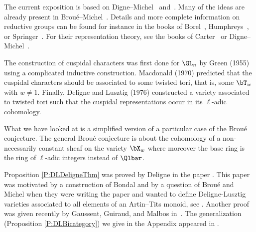 The current exposition is based on Digne--Michel~\cite{DiMBook} and~\cite{DiMDel}. Many of the ideas are already present in Brou\'e--Michel~\cite{BrMi}. Details and more complete information on reductive groups can be found for instance in the books of Borel~\cite{borel}, Humphreys~\cite{humphreys}, or Springer~\cite{springer}. For their representation theory, see the books of Carter~\cite{carter} or Digne--Michel~\cite{DiMBook}. 

The construction of cuspidal characters was first done  for $\GL_n$ by Green (1955) using a complicated inductive construction. Macdonald (1970) predicted that the cuspidal characters should be associated to some twisted tori, that is, some $\bT_w$ with $w\ne 1$. Finally, Deligne and Lusztig (1976) constructed a variety associated to twisted tori such that the cuspidal representations occur in its $\ell$-adic cohomology.

What we have looked at is a simplified version of  a particular case of the Brou\'e conjecture. The general Brou\'e conjecture is about the cohomology of a non-necessarily constant sheaf on the variety $\bX_w$ where moreover the base ring is the ring of $\ell$-adic integers instead of $\Qlbar$. 

Proposition \ref{P:DLDeligneThm} was proved by Deligne in the paper \cite{Deligne}. This paper was motivated by a construction of Bondal and by a question of Brou\'e and Michel when they were writing the paper \cite{BrMi} and wanted to define Deligne-Lusztig varieties associated to all elements of an Artin--Tits monoid, see \cite[1.6]{BrMi}. Another proof was given recently by Gaussent, Guiraud, and Malbos in~\cite{GGM}. The generalization (Proposition \ref{P:DLBicategory})
we give in the Appendix appeared in \cite{DiMPar}.

